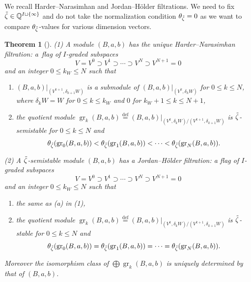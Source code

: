 \documentclass[10pt,a4paper]{amsart}
\newenvironment{aenume}{%
  \begin{enumerate}%
  \renewcommand{\theenumi}{\alph{enumi}}%
  \renewcommand{\labelenumi}{\textup{(\theenumi)}}%
  }{\end{enumerate}}
\newtheorem{Theorem}[equation]{Theorem}
\theoremstyle{definition}
\numberwithin{equation}{section}
\newcommand{\defeq}{\overset{\operatorname{\scriptstyle def}}{=}}
\newcommand{\Q}{{\mathbb Q}}
\newcommand{\gr}{\operatorname{gr}} %
\begin{document}
We recall Harder--Narasimhan and Jordan--H\"older f\/iltrations. We need
to f\/ix $\Tilde\zeta\in \Q^{I\sqcup\{\infty\}}$ and do not take the
normalization condition $\theta_{\Tilde\zeta} = 0$ as we want to
compare $\theta_{\Tilde\zeta}$-values for various dimension vectors.

\begin{Theorem}[\cite{Rudakov}]\label{thm:Rudakov}
\textup{(1)} A module $(B,a,b)$ has the unique Harder--Narasimhan
filtration\textup:
a~flag of $I$-graded subspaces
\begin{equation*}
  V = V^0 \supset V^1 \supset \cdots \supset V^N \supset V^{N+1} = 0
\end{equation*}
and an integer $0 \le k_W \le N$ such that
\begin{aenume}\itemsep=0pt
\item $(B,a,b)|_{(V^{k+1}, \delta_{k+1} W)}$ is a submodule of
  $(B,a,b)|_{(V^k,\delta_k W)}$ for $0\le k \le N$,
where $\delta_k W = W$ for $0\le k\le k_W$ and $0$
for $k_W + 1\le k \le N+1$,

\item the quotient module $\gr_k (B,a,b) \defeq
  (B,a,b)|_{(V^k,\delta_k W)/(V^{k+1},\delta_{k+1} W)}$ is
  $\Tilde\zeta$-semistable for $0\le k\le N$ and
\[
    \theta_{\Tilde\zeta}(\gr_0(B,a,b))
    < \theta_{\Tilde\zeta}(\gr_1(B,a,b)) < \cdots
    < \theta_{\Tilde\zeta}(\gr_N(B,a,b)).
\]
\end{aenume}

\textup{(2)} A $\Tilde\zeta$-semistable module $(B,a,b)$ has a
Jordan--H\"older filtration\textup:
a f\/lag of $I$-graded subspaces
\begin{equation*}
  V = V^0 \supset V^1 \supset \cdots \supset V^N \supset V^{N+1} = 0
\end{equation*}
and an integer $0 \le k_W \le N$ such that
\begin{aenume}\itemsep=0pt
\item the same as \textup{(a)} in \textup{(1)},

\item the quotient module $\gr_k (B,a,b)\defeq (B,a,b)|_{(V^k,\delta_k
    W)/(V^{k+1},\delta_{k+1} W)}$ is $\Tilde\zeta$-stable for $0\le
  k\le N$ and
\[
    \theta_{\Tilde\zeta}(\gr_0(B,a,b))
    = \theta_{\Tilde\zeta}(\gr_1(B,a,b)) = \cdots
    = \theta_{\Tilde\zeta}(\gr_N(B,a,b)).
\]
\end{aenume}
Moreover the isomorphism class of $\bigoplus \gr_k(B,a,b)$ is uniquely
determined by that of $(B,a,b)$.
\end{Theorem}
\end{document}
